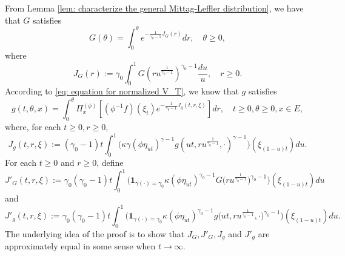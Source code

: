 \documentclass[12pt, a4paper]{amsart}
\theoremstyle{definition}
\numberwithin{equation}{section}
\begin{document}
	From Lemma \ref{lem: characterize the general Mittag-Leffler distribution}, we have that $G$ satisfies
\begin{equation}\label{eq: equation for G}
	G(\theta)
	= \int_0^\theta e^{ - \frac{1} {\gamma_0 - 1} J_G(r)} dr,
	\quad \theta \geq 0,
\end{equation}
	where
\begin{equation}\label{eq: definition for J_G}
	J_G(r):=
	\gamma_0 \int_0^1 G(ru^{\frac{1}{\gamma_0 - 1}}) ^{\gamma_0 - 1}\frac{du}{u},
	\quad r\geq 0 .
\end{equation}
	According to \eqref{eq: equation for normalized V_T}, we know that $g$ satisfies
\begin{equation}\label{eq: equation for g}
	g(t,\theta, x)= \int_0^{\theta} \Pi_x^{(\phi)} [ (\phi^{-1}f)(\xi_t) e^{-\frac{1}{\gamma_0 - 1} J_g(t,r,\xi) } ] dr,
	\quad t\geq 0, \theta \geq 0, x\in E,
\end{equation}
	where, for each $t\geq 0, r\geq 0$,
\begin{equation}\label{eq: definition for J_g}
	J_g(t,r,\xi):=
	(\gamma_0 - 1)t\int_0^1 \big(  \kappa\gamma (   \phi \eta_{ut}  )^{\gamma - 1} g (ut,ru^{\frac{1}{\gamma_0 - 1}},\cdot )^{\gamma-1}  \big) (  \xi_{(1-u)t}  ) du.
\end{equation}
	For each $t\geq 0$ and $r\geq 0$, define
\begin{equation}\label{eq: definition of J'_G}
	J'_G(t,r,\xi):=
	\gamma_0 (\gamma_0 - 1) t \int_0^1 \big( \mathbf 1_{\gamma(\cdot) = \gamma_0} \kappa (\phi \eta_{ut})^{\gamma_0 - 1} G\big( ru^{\frac{1}{\gamma_0 - 1}} \big) ^{\gamma_0 - 1} \big) (\xi_{(1-u)t}) du
\end{equation}
	and
\begin{equation}\label{eq: definition of J'_g}
	J'_g(t,r,\xi):=
	\gamma_0 (\gamma_0 - 1) t \int_0^1 \big( \mathbf 1_{\gamma(\cdot) = \gamma_0} \kappa (\phi \eta_{ut})^{\gamma_0 - 1} g\big( ut,ru^{\frac{1}{\gamma_0 - 1}}, \cdot \big)^{\gamma_0 - 1}  \big) (\xi_{(1-u)t})  du.
\end{equation}
	The underlying idea of the proof is to show that $J_G,J'_G,J_g$ and $J'_g$ are approximately equal in some sense when $t\to \infty$.
	
\end{document}
